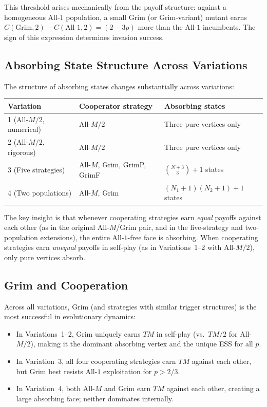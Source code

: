 \documentclass[12pt,a4paper]{article}
\begin{document}
This threshold arises mechanically from the payoff structure: against a
homogeneous All-$1$ population, a small Grim (or Grim-variant) mutant earns
$C(\text{Grim},2) - C(\text{All-}1,2) = (2-3p)$ more than the All-$1$
incumbents. The sign of this expression determines invasion success.

\subsection{Absorbing State Structure Across Variations}

The structure of absorbing states changes substantially across variations:

\begin{center}
\renewcommand{\arraystretch}{1.2}
\begin{tabular}{lll}
\toprule
Variation & Cooperator strategy & Absorbing states \\
\midrule
1 (All-$M/2$, numerical)  & All-$M/2$ & Three pure vertices only \\
2 (All-$M/2$, rigorous)   & All-$M/2$ & Three pure vertices only \\
3 (Five strategies)        & All-$M$, Grim, GrimP, GrimF & $\binom{N+3}{3}+1$ states \\
4 (Two populations)        & All-$M$, Grim & $(N_1+1)(N_2+1)+1$ states \\
\bottomrule
\end{tabular}
\end{center}

The key insight is that whenever cooperating strategies earn \emph{equal}
payoffs against each other (as in the original All-$M$/Grim pair, and in the
five-strategy and two-population extensions), the entire All-$1$-free face is
absorbing. When cooperating strategies earn \emph{unequal} payoffs in self-play
(as in Variations~1--2 with All-$M/2$), only pure vertices absorb.

\subsection{Grim and Cooperation}

Across all variations, Grim (and strategies with similar trigger structures) is
the most successful in evolutionary dynamics:
\begin{itemize}
  \item In Variations~1--2, Grim uniquely earns $TM$ in self-play (vs.\ $TM/2$
        for All-$M/2$), making it the dominant absorbing vertex and the unique
        ESS for all $p$.
  \item In Variation~3, all four cooperating strategies earn $TM$ against each
        other, but Grim best resists All-$1$ exploitation for $p > 2/3$.
  \item In Variation~4, both All-$M$ and Grim earn $TM$ against each other,
        creating a large absorbing face; neither dominates internally.
\end{itemize}
\end{document}
